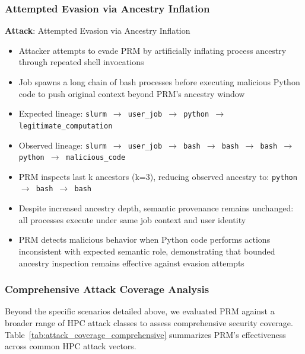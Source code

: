 \documentclass[]{sn-jnl}
\begin{document}
\subsubsection{Attempted Evasion via Ancestry Inflation}

\textbf{Attack}: Attempted Evasion via Ancestry Inflation
\begin{itemize}
\item Attacker attempts to evade PRM by artificially inflating process ancestry
      through repeated shell invocations
\item Job spawns a long chain of bash processes before executing malicious Python
      code to push original context beyond PRM's ancestry window
\item Expected lineage: \texttt{slurm $\rightarrow$ user\_job $\rightarrow$ python $\rightarrow$ legitimate\_computation}
\item Observed lineage: \texttt{slurm $\rightarrow$ user\_job $\rightarrow$ bash $\rightarrow$ bash $\rightarrow$ bash $\rightarrow$ python $\rightarrow$ malicious\_code}
\item PRM inspects last k ancestors (k=3), reducing observed ancestry to:
      \texttt{python $\rightarrow$ bash $\rightarrow$ bash}
\item Despite increased ancestry depth, semantic provenance remains unchanged: all
      processes execute under same job context and user identity
\item PRM detects malicious behavior when Python code performs actions inconsistent
      with expected semantic role, demonstrating that bounded ancestry inspection
      remains effective against evasion attempts
\end{itemize}

\subsubsection{Comprehensive Attack Coverage Analysis}

Beyond the specific scenarios detailed above, we evaluated PRM against a broader
range of HPC attack classes to assess comprehensive security coverage.
Table~\ref{tab:attack_coverage_comprehensive} summarizes PRM's effectiveness
across common HPC attack vectors.
\end{document}
